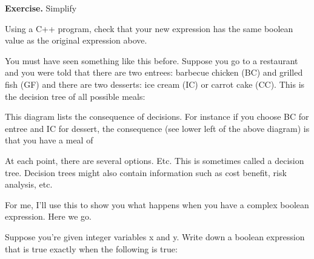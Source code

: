 {{{{{\textbf{Exercise.} Simplify


Using a C++ program, check that your new expression has the same
boolean value as the original expression above.


You must have seen something like this before. Suppose you go to a
restaurant and you were told that there are two entrees: barbecue
chicken (BC) and grilled fish (GF) and there are two desserts: ice cream
(IC) or carrot cake (CC). This is the decision tree of all possible meals:


This diagram lists the consequence of decisions. For instance if you
choose BC for entree and IC for dessert, the consequence (see lower left
of the above diagram) is that you have a meal of


At each point, there are several options. Etc. This is sometimes called a
decision tree. Decision trees might also contain information such as cost
benefit, risk analysis, etc.

For me, I'll use this to show you what happens when you have a
complex boolean expression. Here we go.

Suppose you're given integer variables x and y. Write down a boolean
expression that is true exactly when the following is true:

}}}}}
